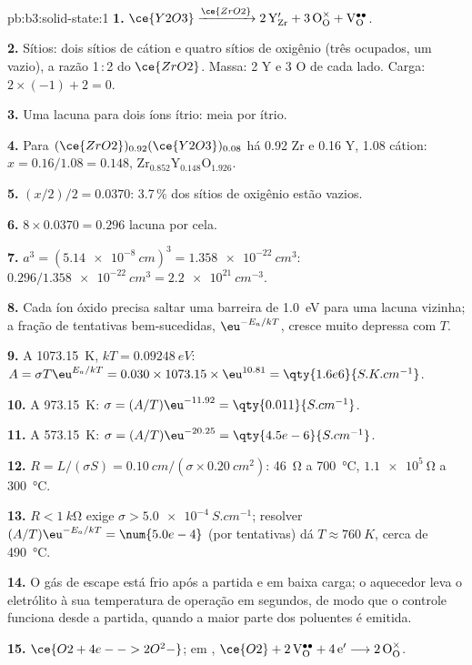 \begin{solution}{pb:b3:solid-state:1}
\textbf{1.} $\ce{Y2O3} \xrightarrow{\ce{ZrO2}} \mathrm{2\,Y_{Zr}' + 3\,O_O^{\times} + V_O^{\bullet\bullet}}$.

\textbf{2.} Sítios: dois sítios de cátion e quatro sítios de oxigênio (três ocupados, um vazio),
a razão 1\,:\,2 do $\ce{ZrO2}$. Massa: 2 Y e 3 O de cada lado. Carga: $2 \times (-1) + 2 = 0$.

\textbf{3.} Uma lacuna para dois íons ítrio: meia por ítrio.

\textbf{4.} Para $(\ce{ZrO2})_{0.92}(\ce{Y2O3})_{0.08}$ há 0.92 Zr e 0.16 Y, 1.08 cátion: $x = 0.16/1.08 = 0.148$,
$\mathrm{Zr_{0.852}Y_{0.148}O_{1.926}}$.

\textbf{5.} $(x/2)/2 = 0.0370$: 3.7\,\% dos sítios de oxigênio estão vazios.

\textbf{6.} $8 \times 0.0370 = 0.296$ lacuna por cela.

\textbf{7.} $a^3 = (\qty{5.14e-8}{cm})^3 = \qty{1.358e-22}{cm^3}$: $0.296/\qty{1.358e-22}{cm^3} = \qty{2.2e21}{cm^{-3}}$.

\textbf{8.} Cada íon óxido precisa saltar uma barreira de \qty{1.0}{eV} para uma lacuna
vizinha; a fração de tentativas bem-sucedidas, $\eu^{-E_a/kT}$, cresce muito depressa com $T$.

\textbf{9.} A \qty{1073.15}{K}, $kT = \qty{0.09248}{eV}$: $A = \sigma T\eu^{E_a/kT} = 0.030 \times 1073.15 \times \eu^{10.81} = \qty{1.6e6}{S.K.cm^{-1}}$.

\textbf{10.} A \qty{973.15}{K}: $\sigma = (A/T)\eu^{-11.92} = \qty{0.011}{S.cm^{-1}}$.

\textbf{11.} A \qty{573.15}{K}: $\sigma = (A/T)\eu^{-20.25} = \qty{4.5e-6}{S.cm^{-1}}$.

\textbf{12.} $R = L/(\sigma S) = \qty{0.10}{cm}/(\sigma \times \qty{0.20}{cm^2})$: \qty{46}{\ohm} a \qty{700}{\celsius}, $\qty{1.1e5}{\ohm}$ a \qty{300}{\celsius}.

\textbf{13.} $R < \qty{1}{k\ohm}$ exige $\sigma > \qty{5.0e-4}{S.cm^{-1}}$; resolver $(A/T)\eu^{-E_a/kT} = \num{5.0e-4}$ (por tentativas)
dá $T \approx \qty{760}{K}$, cerca de \qty{490}{\celsius}.

\textbf{14.} O gás de escape está frio após a partida e em baixa carga; o aquecedor leva o
eletrólito à sua temperatura de operação em segundos, de modo que o controle
funciona desde a partida, quando a maior parte dos poluentes é emitida.

\textbf{15.} $\ce{O2 + 4e- -> 2O^2-}$; em , $\ce{O2} + \mathrm{2\,V_O^{\bullet\bullet} + 4\,e'} \longrightarrow \mathrm{2\,O_O^{\times}}$.


\end{solution}

